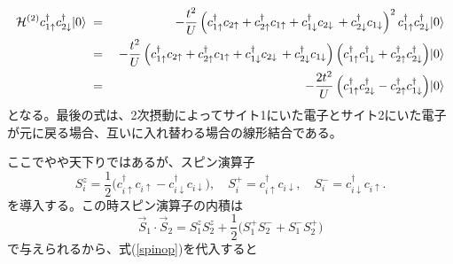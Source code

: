 \documentclass[12pt]{jarticle}
\begin{document}
\begin{eqnarray}
  \mathcal{H}^{(2)}
c_{1\uparrow}^\dagger c_{2\downarrow}^\dagger\!\ket{0}
\;&=&\;
-\frac{t^2}{U}\,
\Bigl(
   c_{1\uparrow}^\dagger c_{2\uparrow}
 + c_{2\uparrow}^\dagger c_{1\uparrow}
 + c_{1\downarrow}^\dagger c_{2\downarrow}\,
 + c_{2\downarrow}^\dagger c_{1\downarrow}
\Bigr)^2\,
c_{1\uparrow}^\dagger c_{2\downarrow}^\dagger\!\ket{0} \notag\\
\;&=&\;
-\frac{t^2}{U}\,
\Bigl(
   c_{1\uparrow}^\dagger c_{2\uparrow}
 + c_{2\uparrow}^\dagger c_{1\uparrow}
 + c_{1\downarrow}^\dagger c_{2\downarrow}\,
 + c_{2\downarrow}^\dagger c_{1\downarrow}
\Bigr)\,
\Bigl(c_{1\uparrow}^\dagger c_{1\downarrow}^\dagger+c_{2\uparrow}^\dagger c_{2\downarrow}^\dagger\Bigr)\!\ket{0} \notag\\
\;&=&\;
-\frac{2t^2}{U}\,
\Bigl(c_{1\uparrow}^\dagger c_{2\downarrow}^\dagger-c_{2\uparrow}^\dagger c_{1\downarrow}^\dagger\Bigr)\!\ket{0}\\
\end{eqnarray}
となる。最後の式は、2次摂動によってサイト1にいた電子とサイト2にいた電子が元に戻る場合、互いに入れ替わる場合の線形結合である。

ここでやや天下りではあるが、スピン演算子
\begin{equation}
S_i^z = \frac12\bigl(c_{i\uparrow}^\dagger c_{i\uparrow} - c_{i\downarrow}^\dagger c_{i\downarrow}\bigr), 
\quad
S_i^+ = c_{i\uparrow}^\dagger c_{i\downarrow}, 
\quad
S_i^- = c_{i\downarrow}^\dagger c_{i\uparrow}.
\label{spinop}
\end{equation}
を導入する。この時スピン演算子の内積は
\begin{equation}
  \vec S_1 \cdot \vec S_2
= S_1^z S_2^z + \frac12 \bigl(S_1^+ S_2^- + S_1^- S_2^+\bigr)
\end{equation}
で与えられるから、式(\ref{spinop})を代入すると
\end{document}
